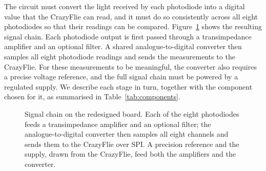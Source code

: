 The circuit must convert the light received by each photodiode into a digital value that the CrazyFlie can read, and it must do so consistently across all eight photodiodes so that their readings can be compared. Figure~\ref{fig:signal-chain} shows the resulting signal chain. Each photodiode output is first passed through a transimpedance amplifier and an optional filter. A shared analogue-to-digital converter then samples all eight photodiode readings and sends the measurements to the CrazyFlie. For these measurements to be meaningful, the converter also requires a precise voltage reference, and the full signal chain must be powered by a regulated supply. We describe each stage in turn, together with the component chosen for it, as summarised in Table~\ref{tab:components}.


\begin{figure}[h]
    \centering
    \caption{Signal chain on the redesigned board. Each of the eight photodiodes feeds a transimpedance amplifier and an optional filter; the analogue-to-digital converter then samples all eight channels and sends them to the CrazyFlie over SPI. A precision reference and the supply, drawn from the CrazyFlie, feed both the amplifiers and the converter.}
    \label{fig:signal-chain}
\end{figure}

